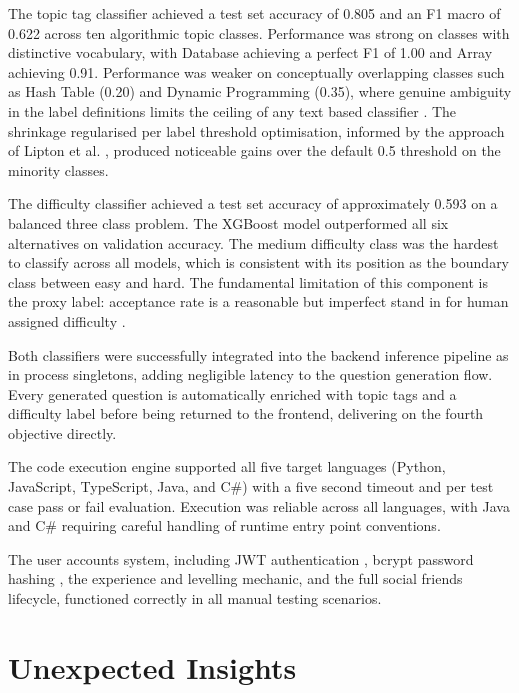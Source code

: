 The topic tag classifier achieved a test set accuracy of 0.805 and an
F1 macro of 0.622 across ten algorithmic topic classes. Performance
was strong on classes with distinctive vocabulary, with Database
achieving a perfect F1 of 1.00 and Array achieving 0.91. Performance
was weaker on conceptually overlapping classes such as Hash Table
(0.20) and Dynamic Programming (0.35), where genuine ambiguity in the
label definitions limits the ceiling of any text based classifier
\cite{zhang2014multilabel}. The shrinkage regularised per label
threshold optimisation, informed by the approach of Lipton et al.
\cite{lipton2014thresholding}, produced noticeable gains over the
default 0.5 threshold on the minority classes.

The difficulty classifier achieved a test set accuracy of approximately
0.593 on a balanced three class problem. The XGBoost model
\cite{chen2016xgboost} outperformed all six alternatives on validation
accuracy. The medium difficulty class was the hardest to classify
across all models, which is consistent with its position as the
boundary class between easy and hard. The fundamental limitation of
this component is the proxy label: acceptance rate is a reasonable
but imperfect stand in for human assigned difficulty
\cite{zhou2017weaksupervision}.

Both classifiers were successfully integrated into the backend
inference pipeline as in process singletons, adding negligible latency
to the question generation flow. Every generated question is
automatically enriched with topic tags and a difficulty label before
being returned to the frontend, delivering on the fourth objective
directly.

The code execution engine supported all five target languages (Python,
JavaScript, TypeScript, Java, and C\#) with a five second timeout and
per test case pass or fail evaluation. Execution was reliable across
all languages, with Java and C\# requiring careful handling of runtime
entry point conventions.

The user accounts system, including JWT authentication \cite{jwt2015},
bcrypt password hashing \cite{provos1999bcrypt}, the experience and
levelling mechanic, and the full social friends lifecycle, functioned
correctly in all manual testing scenarios.

\section{Unexpected Insights}

